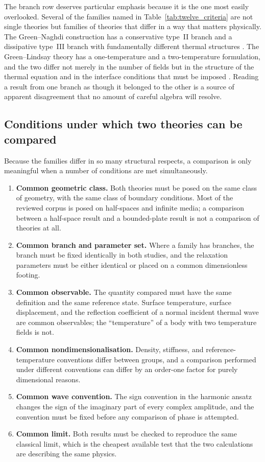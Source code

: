 The branch row deserves particular emphasis because it is the one most easily overlooked. Several of the families named in Table~\ref{tab:twelve_criteria} are not single theories but families of theories that differ in a way that matters physically. The Green--Naghdi construction has a conservative type~II branch and a dissipative type~III branch with fundamentally different thermal structures \cite{Green1991,Green1993}. The Green--Lindsay theory has a one-temperature and a two-temperature formulation, and the two differ not merely in the number of fields but in the structure of the thermal equation and in the interface conditions that must be imposed \cite{Green1972}. Reading a result from one branch as though it belonged to the other is a source of apparent disagreement that no amount of careful algebra will resolve.

\subsection{Conditions under which two theories can be compared}
\label{sec:12.5}

Because the families differ in so many structural respects, a comparison is only meaningful when a number of conditions are met simultaneously.

\begin{enumerate}
\item \textbf{Common geometric class.} Both theories must be posed on the same class of geometry, with the same class of boundary conditions. Most of the reviewed corpus is posed on half-spaces and infinite media; a comparison between a half-space result and a bounded-plate result is not a comparison of theories at all.
\item \textbf{Common branch and parameter set.} Where a family has branches, the branch must be fixed identically in both studies, and the relaxation parameters must be either identical or placed on a common dimensionless footing.
\item \textbf{Common observable.} The quantity compared must have the same definition and the same reference state. Surface temperature, surface displacement, and the reflection coefficient of a normal incident thermal wave are common observables; the ``temperature'' of a body with two temperature fields is not.
\item \textbf{Common nondimensionalisation.} Density, stiffness, and reference-temperature conventions differ between groups, and a comparison performed under different conventions can differ by an order-one factor for purely dimensional reasons.
\item \textbf{Common wave convention.} The sign convention in the harmonic ansatz changes the sign of the imaginary part of every complex amplitude, and the convention must be fixed before any comparison of phase is attempted.
\item \textbf{Common limit.} Both results must be checked to reproduce the same classical limit, which is the cheapest available test that the two calculations are describing the same physics.
\end{enumerate}

